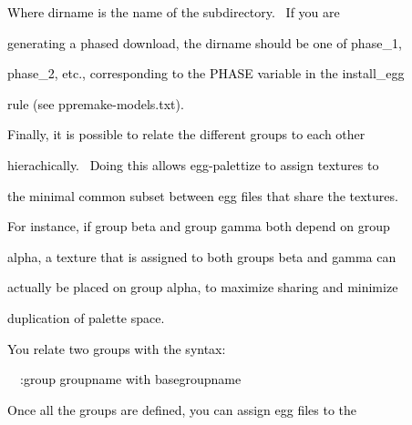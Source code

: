 \documentclass[a4paper]{article}
\newcommand\textstyleOOoComputerKeyWord[1]{\textrm{\textcolor[rgb]{0.0,0.0,0.5019608}{#1}}}
\begin{document}
\bigskip

{\color{black}
\textstyleOOoComputerKeyWord{\textcolor{black}{Where dirname is the name of the subdirectory. \ If you are}}}

{\color{black}
\textstyleOOoComputerKeyWord{\textcolor{black}{generating a phased download, the dirname should be one of phase\_1,}}}

{\color{black}
\textstyleOOoComputerKeyWord{\textcolor{black}{phase\_2, etc., corresponding to the PHASE variable in the
install\_egg}}}

{\color{black}
\textstyleOOoComputerKeyWord{\textcolor{black}{rule (see ppremake-models.txt).}}}


\bigskip


\bigskip

{\color{black}
\textstyleOOoComputerKeyWord{\textcolor{black}{Finally, it is possible to relate the different groups to each other}}}

{\color{black}
\textstyleOOoComputerKeyWord{\textcolor{black}{hierachically. \ Doing this allows egg-palettize to assign textures to}}}

{\color{black}
\textstyleOOoComputerKeyWord{\textcolor{black}{the minimal common subset between egg files that share the textures.}}}

{\color{black}
\textstyleOOoComputerKeyWord{\textcolor{black}{For instance, if group beta and group gamma both depend on group}}}

{\color{black}
\textstyleOOoComputerKeyWord{\textcolor{black}{alpha, a texture that is assigned to both groups beta and gamma can}}}

{\color{black}
\textstyleOOoComputerKeyWord{\textcolor{black}{actually be placed on group alpha, to maximize sharing and minimize}}}

{\color{black}
\textstyleOOoComputerKeyWord{\textcolor{black}{duplication of palette space.}}}


\bigskip

{\color{black}
\textstyleOOoComputerKeyWord{\textcolor{black}{You relate two groups with the syntax:}}}


\bigskip

{\color{black}
\textstyleOOoComputerKeyWord{\textcolor{black}{\ \ :group groupname with basegroupname}}}


\bigskip

{\color{black}
\textstyleOOoComputerKeyWord{\textcolor{black}{Once all the groups are defined, you can assign egg files to the}}}
\end{document}
